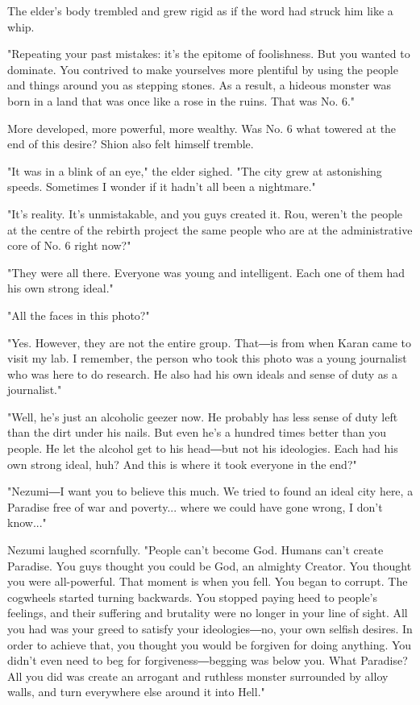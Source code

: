 The elder's body trembled and grew rigid as if the word had struck him
like a whip.

"Repeating your past mistakes: it's the epitome of foolishness. But you
wanted to dominate. You contrived to make yourselves more plentiful by
using the people and things around you as stepping stones. As a result,
a hideous monster was born in a land that was once like a rose in the
ruins. That was No. 6."

More developed, more powerful, more wealthy. Was No. 6 what towered at
the end of this desire? Shion also felt himself tremble.

"It was in a blink of an eye," the elder sighed. "The city grew at
astonishing speeds. Sometimes I wonder if it hadn't all been a
nightmare."

"It's reality. It's unmistakable, and you guys created it. Rou, weren't
the people at the centre of the rebirth project the same people who are
at the administrative core of No. 6 right now?"

"They were all there. Everyone was young and intelligent. Each one of
them had his own strong ideal."

"All the faces in this photo?"

"Yes. However, they are not the entire group. That―is from when Karan
came to visit my lab. I remember, the person who took this photo was a
young journalist who was here to do research. He also had his own ideals
and sense of duty as a journalist."

"Well, he's just an alcoholic geezer now. He probably has less sense of
duty left than the dirt under his nails. But even he's a hundred times
better than you people. He let the alcohol get to his head―but not his
ideologies. Each had his own strong ideal, huh? And this is where it
took everyone in the end?"

"Nezumi―I want you to believe this much. We tried to found an ideal city
here, a Paradise free of war and poverty... where we could have gone
wrong, I don't know..."

Nezumi laughed scornfully. "People can't become God. Humans can't create
Paradise. You guys thought you could be God, an almighty Creator. You
thought you were all-powerful. That moment is when you fell. You began
to corrupt. The cogwheels started turning backwards. You stopped paying
heed to people's feelings, and their suffering and brutality were no
longer in your line of sight. All you had was your greed to satisfy your
ideologies―no, your own selfish desires. In order to achieve that, you
thought you would be forgiven for doing anything. You didn't even need
to beg for forgiveness―begging was below you. What Paradise? All you did
was create an arrogant and ruthless monster surrounded by alloy walls,
and turn everywhere else around it into Hell."

